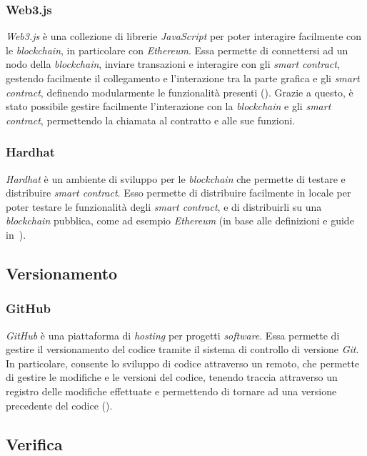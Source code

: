 \subsubsection{Web3.js}\label{subsubsec:web3js}
\textit{Web3.js} è una collezione di librerie \textit{JavaScript} per poter interagire facilmente con le \textit{blockchain}, in particolare con \textit{Ethereum}.
Essa permette di connettersi ad un nodo della \textit{blockchain}, inviare transazioni e interagire con gli \textit{smart contract}, gestendo facilmente il collegamento
e l'interazione tra la parte grafica e gli \textit{smart contract}, definendo modularmente le funzionalità presenti (\cite{site:web3}).
Grazie a questo, è stato possibile gestire facilmente l'interazione con la \textit{blockchain} e gli \textit{smart contract}, permettendo la chiamata al contratto
e alle sue funzioni.

\subsubsection{Hardhat}\label{subsubsec:hardhat}
\textit{Hardhat} è un ambiente di sviluppo per le \textit{blockchain} che permette di testare e distribuire \textit{smart contract}. Esso permette di distribuire facilmente
in locale per poter testare le funzionalità degli \textit{smart contract}, e di distribuirli su una \textit{blockchain} pubblica, come ad esempio
\textit{Ethereum} (in base alle definizioni e guide in~\cite{site:hardhat}).

\subsection{Versionamento}\label{subsec:versionamento}

\subsubsection{GitHub}\label{subsubsec:github}
\textit{GitHub} è una piattaforma di \textit{hosting} per progetti \textit{software}. Essa permette di gestire il versionamento del codice tramite il sistema di controllo di versione \textit{Git}.
In particolare, consente lo sviluppo di codice attraverso un  remoto, che permette di gestire le modifiche e le versioni del codice, tenendo traccia attraverso un registro
delle modifiche effettuate e permettendo di tornare ad una versione precedente del codice (\cite{site:github}). 

\subsection{Verifica}\label{subsec:verifica}

